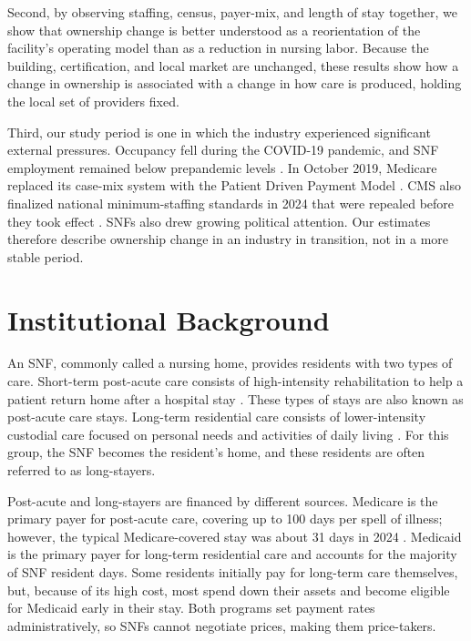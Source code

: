 \documentclass[12pt]{article}
\begin{document}
Second, by observing staffing, census, payer-mix, and length of stay together, we show that ownership change is better understood as a reorientation of the facility's operating model than as a reduction in nursing labor. Because the building, certification, and local market are unchanged, these results show how a change in ownership is associated with a change in how care is produced, holding the local set of providers fixed.

Third, our study period is one in which the industry experienced significant external pressures. Occupancy fell during the COVID-19 pandemic, and SNF employment remained below prepandemic levels \citep{MedPAC2026Report}. In October 2019, Medicare replaced its case-mix system with the Patient Driven Payment Model \citep{cms_2018_pdpm}. CMS also finalized national minimum-staffing standards in 2024 that were repealed before they took effect \citep{cms_2024_min_staffing, cms_2025_staffing_repeal}. SNFs also drew growing political attention. Our estimates therefore describe ownership change in an industry in transition, not in a more stable period.

\section{Institutional Background} \label{sec:background}

An SNF, commonly called a nursing home, provides residents with two types of care. Short-term post-acute care consists of high-intensity rehabilitation to help a patient return home after a hospital stay \citep{CMSBenefitManualCh8}. These types of stays are also known as post-acute care stays. Long-term residential care consists of lower-intensity custodial care focused on personal needs and activities of daily living \citep{CMSBenefitManualCh16}. For this group, the SNF becomes the resident's home, and these residents are often referred to as long-stayers.

Post-acute and long-stayers are financed by different sources. Medicare is the primary payer for post-acute care, covering up to 100 days per spell of illness; however, the typical Medicare-covered stay was about 31 days in 2024 \citep{MedPAC2026Report}. Medicaid is the primary payer for long-term residential care and accounts for the majority of SNF resident days. Some residents initially pay for long-term care themselves, but, because of its high cost, most spend down their assets and become eligible for Medicaid early in their stay. Both programs set payment rates administratively, so SNFs cannot negotiate prices, making them price-takers.
\end{document}
